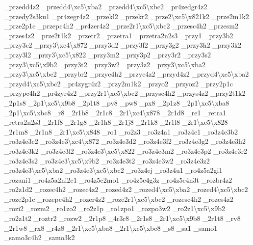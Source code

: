 {\-\_\-przedd4z2 \-\_\-przedd4\textbackslash{}xc5\textbackslash{}xba2 \-\_\-przedd4\textbackslash{}xc5\textbackslash{}xbc2 \-\_\-pr4zedgr4z2 \-\_\-przedy2s3ku1 \-\_\-pr4zegr4z2 \-\_\-przekl2 \-\_\-przekr2 \-\_\-prze2\textbackslash{}xc5\textbackslash{}x821k2 \-\_\-prze2m1k2 \-\_\-prze2p1c \-\_\-przepc4h2 \-\_\-pr4zer4z2 \-\_\-prze2r1\textbackslash{}xc5\textbackslash{}xbc2 \-\_\-przesc4h2 \-\_\-przesm2 \-\_\-przes4z2 \-\_\-prze2t1k2 \-\_\-przetr2 \-\_\-przetra1 \-\_\-przetra2n2s3 \-\_\-przy1 \-\_\-przy3b2 \-\_\-przy3c2 \-\_\-przy3\textbackslash{}xc4\textbackslash{}x872 \-\_\-przy3d2 \-\_\-przy3f2 \-\_\-przy3g2 \-\_\-przy3h2 \-\_\-przy3k2 \-\_\-przy3l2 \-\_\-przy3\textbackslash{}xc5\textbackslash{}x822 \-\_\-przy3m2 \-\_\-przy3p2 \-\_\-przy3r2 \-\_\-przy3s2 \-\_\-przy3\textbackslash{}xc5\textbackslash{}x9b2 \-\_\-przy3t2 \-\_\-przy3w2 \-\_\-przy3z2 \-\_\-przy3\textbackslash{}xc5\textbackslash{}xba2 \-\_\-przy3\textbackslash{}xc5\textbackslash{}xbc2 \-\_\-przybr2 \-\_\-przyc4h2 \-\_\-przyc4z2 \-\_\-przyd4z2 \-\_\-przyd4\textbackslash{}xc5\textbackslash{}xba2 \-\_\-przyd4\textbackslash{}xc5\textbackslash{}xbc2 \-\_\-pr4zygr4z2 \-\_\-przy2m1k2 \-\_\-przyo2 \-\_\-przyoz2 \-\_\-przy2p1c \-\_\-przypc4h2 \-\_\-pr4zyr4z2 \-\_\-przy2r1\textbackslash{}xc5\textbackslash{}xbc2 \-\_\-przysc4h2 \-\_\-przys4z2 \-\_\-przy2t1k2 \-\_\-2p1s8 \-\_\-2p1\textbackslash{}xc5\textbackslash{}x9b8 \-\_\-2p1t8 \-\_\-pv8 \-\_\-pw8 \-\_\-px8 \-\_\-2p1z8 \-\_\-2p1\textbackslash{}xc5\textbackslash{}xba8 \-\_\-2p1\textbackslash{}xc5\textbackslash{}xbc8 \-\_\-r8 \-\_\-2r1b8 \-\_\-2r1c8 \-\_\-2r1\textbackslash{}xc4\textbackslash{}x878 \-\_\-2r1d8 \-\_\-re1 \-\_\-retra1 \-\_\-retra2n2s3 \-\_\-2r1f8 \-\_\-2r1g8 \-\_\-2r1h8 \-\_\-2r1j8 \-\_\-2r1k8 \-\_\-2r1l8 \-\_\-2r1\textbackslash{}xc5\textbackslash{}x828 \-\_\-2r1m8 \-\_\-2r1n8 \-\_\-2r1\textbackslash{}xc5\textbackslash{}x848 \-\_\-ro1 \-\_\-ro2z3 \-\_\-ro3z4a1 \-\_\-ro3z4e1 \-\_\-ro3z4e3b2 \-\_\-ro3z4e3c2 \-\_\-ro3z4e3\textbackslash{}xc4\textbackslash{}x872 \-\_\-ro3z4e3d2 \-\_\-ro3z4e3f2 \-\_\-ro3z4e3g2 \-\_\-ro3z4e3h2 \-\_\-ro3z4e3k2 \-\_\-ro3z4e3l2 \-\_\-ro3z4e3\textbackslash{}xc5\textbackslash{}x822 \-\_\-ro3z4e3m2 \-\_\-ro3z4e3p2 \-\_\-ro3z4e3r2 \-\_\-ro3z4e3s2 \-\_\-ro3z4e3\textbackslash{}xc5\textbackslash{}x9b2 \-\_\-ro3z4e3t2 \-\_\-ro3z4e3w2 \-\_\-ro3z4e3z2 \-\_\-ro3z4e3\textbackslash{}xc5\textbackslash{}xba2 \-\_\-ro3z4e3\textbackslash{}xc5\textbackslash{}xbc2 \-\_\-ro3z4ej \-\_\-ro3z4u1 \-\_\-ro4z5a2gi1 \-\_\-rozani1 \-\_\-ro4z5a2ni2e1 \-\_\-ro4z5e2mo1 \-\_\-ro4z5e4g3z \-\_\-ro4z5e4n3t \-\_\-rozbr4z2 \-\_\-ro2z1d2 \-\_\-rozec4h2 \-\_\-rozec4z2 \-\_\-rozed4z2 \-\_\-rozed4\textbackslash{}xc5\textbackslash{}xba2 \-\_\-rozed4\textbackslash{}xc5\textbackslash{}xbc2 \-\_\-roze2p1c \-\_\-rozepc4h2 \-\_\-rozer4z2 \-\_\-roze2r1\textbackslash{}xc5\textbackslash{}xbc2 \-\_\-rozesc4h2 \-\_\-rozes4z2 \-\_\-rozi2 \-\_\-rozm2 \-\_\-ro1zo2 \-\_\-ro2z1p \-\_\-ro1zpo1 \-\_\-rozpo3w2 \-\_\-ro2z1\textbackslash{}xc5\textbackslash{}x9b2 \-\_\-ro2z1t2 \-\_\-roztr2 \-\_\-rozw2 \-\_\-2r1p8 \-\_\-4r3r8 \-\_\-2r1s8 \-\_\-2r1\textbackslash{}xc5\textbackslash{}x9b8 \-\_\-2r1t8 \-\_\-rv8 \-\_\-2r1w8 \-\_\-rx8 \-\_\-r4z8 \-\_\-2r1\textbackslash{}xc5\textbackslash{}xba8 \-\_\-2r1\textbackslash{}xc5\textbackslash{}xbc8 \-\_\-s8 \-\_\-sa1 \-\_\-samo1 \-\_\-samo3c4h2 \-\_\-samo3k2 }

